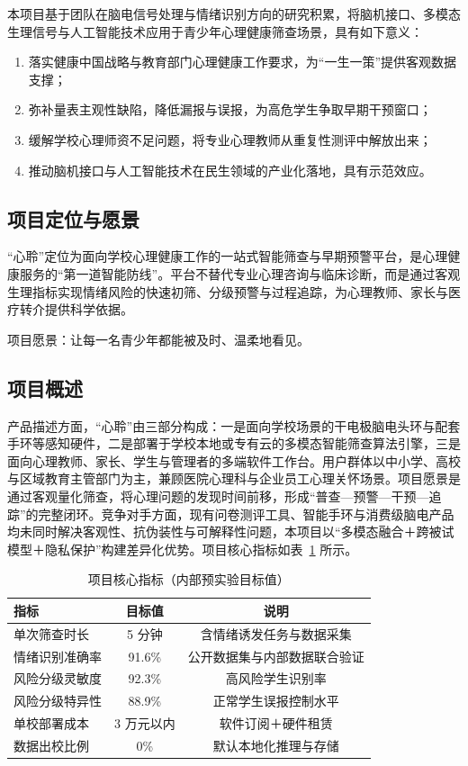 \documentclass[zihao=-4,fontset=windows,a4paper]{ctexart}
\begin{document}
本项目基于团队在脑电信号处理与情绪识别方向的研究积累，将脑机接口、多模态生理信号与人工智能技术应用于青少年心理健康筛查场景，具有如下意义：

\begin{enumerate}
  \item 落实健康中国战略与教育部门心理健康工作要求，为“一生一策”提供客观数据支撑；
  \item 弥补量表主观性缺陷，降低漏报与误报，为高危学生争取早期干预窗口；
  \item 缓解学校心理师资不足问题，将专业心理教师从重复性测评中解放出来；
  \item 推动脑机接口与人工智能技术在民生领域的产业化落地，具有示范效应。
\end{enumerate}

\subsection{项目定位与愿景}

“心聆”定位为面向学校心理健康工作的一站式智能筛查与早期预警平台，是心理健康服务的“第一道智能防线”。平台不替代专业心理咨询与临床诊断，而是通过客观生理指标实现情绪风险的快速初筛、分级预警与过程追踪，为心理教师、家长与医疗转介提供科学依据。

项目愿景：让每一名青少年都能被及时、温柔地看见。

\subsection{项目概述}

产品描述方面，“心聆”由三部分构成：一是面向学校场景的干电极脑电头环与配套手环等感知硬件，二是部署于学校本地或专有云的多模态智能筛查算法引擎，三是面向心理教师、家长、学生与管理者的多端软件工作台。用户群体以中小学、高校与区域教育主管部门为主，兼顾医院心理科与企业员工心理关怀场景。项目愿景是通过客观量化筛查，将心理问题的发现时间前移，形成“普查—预警—干预—追踪”的完整闭环。竞争对手方面，现有问卷测评工具、智能手环与消费级脑电产品均未同时解决客观性、抗伪装性与可解释性问题，本项目以“多模态融合＋跨被试模型＋隐私保护”构建差异化优势。项目核心指标如表~\ref{tab:core} 所示。

\begin{table}[H]
\centering
\caption{项目核心指标（内部预实验目标值）}
\label{tab:core}
\begin{tabular}{lcc}
\toprule
\textbf{指标} & \textbf{目标值} & \textbf{说明} \\
\midrule
单次筛查时长 & 5 分钟 & 含情绪诱发任务与数据采集 \\
情绪识别准确率 & 91.6\% & 公开数据集与内部数据联合验证 \\
风险分级灵敏度 & 92.3\% & 高风险学生识别率 \\
风险分级特异性 & 88.9\% & 正常学生误报控制水平 \\
单校部署成本 & 3 万元以内 & 软件订阅＋硬件租赁 \\
数据出校比例 & 0\% & 默认本地化推理与存储 \\
\bottomrule
\end{tabular}
\end{table}
\end{document}
